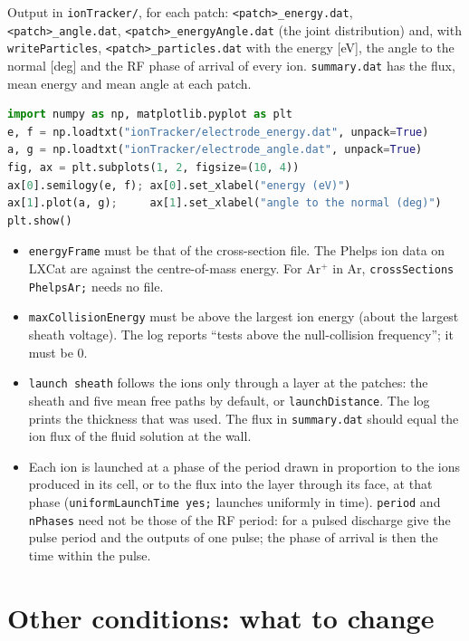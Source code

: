 \documentclass[10pt,a4paper]{article}
\newcommand{\kw}[1]{\texttt{#1}}
\begin{document}
Output in \kw{ionTracker/}, for each patch: \kw{<patch>\_energy.dat},
\kw{<patch>\_angle.dat}, \kw{<patch>\_energyAngle.dat} (the joint
distribution) and, with \kw{writeParticles}, \kw{<patch>\_particles.dat} with
the energy [eV], the angle to the normal [deg] and the RF phase of arrival of
every ion. \kw{summary.dat} has the flux, mean energy and mean angle at each
patch.

\begin{lstlisting}[language=Python]
import numpy as np, matplotlib.pyplot as plt
e, f = np.loadtxt("ionTracker/electrode_energy.dat", unpack=True)
a, g = np.loadtxt("ionTracker/electrode_angle.dat", unpack=True)
fig, ax = plt.subplots(1, 2, figsize=(10, 4))
ax[0].semilogy(e, f); ax[0].set_xlabel("energy (eV)")
ax[1].plot(a, g);     ax[1].set_xlabel("angle to the normal (deg)")
plt.show()
\end{lstlisting}

\begin{itemize}[leftmargin=1.4em,itemsep=1pt]
\item \kw{energyFrame} must be that of the cross-section file. The Phelps
  ion data on LXCat are against the centre-of-mass energy. For Ar$^+$ in Ar,
  \kw{crossSections PhelpsAr;} needs no file.
\item \kw{maxCollisionEnergy} must be above the largest ion energy (about the
  largest sheath voltage). The log reports ``tests above the null-collision
  frequency''; it must be 0.
\item \kw{launch sheath} follows the ions only through a layer at the
  patches: the sheath and five mean free paths by default, or
  \kw{launchDistance}. The log prints the thickness that was used. The flux in
  \kw{summary.dat} should equal the ion flux of the fluid solution at the
  wall.
\item Each ion is launched at a phase of the period drawn in proportion to
  the ions produced in its cell, or to the flux into the layer through its
  face, at that phase (\kw{uniformLaunchTime yes;} launches uniformly in
  time). \kw{period} and \kw{nPhases} need not be those of the RF period:
  for a pulsed discharge give the pulse period and the outputs of one pulse;
  the phase of arrival is then the time within the pulse.
\end{itemize}

\section{Other conditions: what to change}
\end{document}

